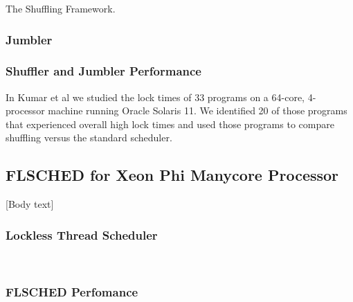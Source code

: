 \documentclass{sig-alternate}
\begin{document}
\begin{algorithm}


	\caption{The Shuffling Framework.}\label{euclid}\label{alg:shuffler}
\end{algorithm}

\subsubsection{Jumbler}
\label{sec:jumbler}



\subsubsection{Shuffler and Jumbler Performance}
\label{sec:sj_performance}

In Kumar et al we studied the lock times of 33 programs on a 64-core, 4-processor machine running Oracle Solaris 11. We identified 20 of those programs that experienced overall high lock times and used those programs to compare shuffling versus the standard scheduler.



\subsection{FLSCHED for Xeon Phi Manycore Processor}
\label{sec:flsched}

[Body text]

\subsubsection{Lockless Thread Scheduler}
\label{sec:flsched_about}

\cite{Lozi:2016, NisarEtal:2017}
~\cite{KumarEtal:2014}

\subsubsection{FLSCHED Perfomance}
\label{sec:flsched_performance}
\end{document}
